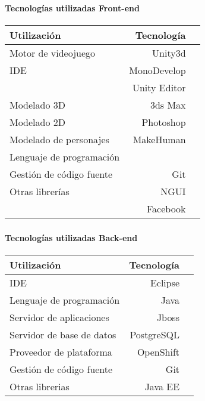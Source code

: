 \begin{frame}
\frametitle{\pagetitle}
\framesubtitle{Tecnologías utilizadas \- Front-end}
\begin{table}
\centering
\begin{tabular}{lrr}
\toprule
\textbf{Utilización} & \textbf{Tecnología} \\
\midrule
Motor de videojuego      & Unity3d         \\
IDE                      & MonoDevelop     \\
                         & Unity Editor    \\
\midrule
Modelado 3D              & 3ds Max         \\
Modelado 2D              & Photoshop       \\
Modelado de personajes   & MakeHuman       \\

\midrule
Lenguaje de programación & \cs{} \\
Gestión de código fuente & Git \\
Otras librerías          & NGUI            \\
                         & Facebook \\
                         
\bottomrule
\end{tabular}
\end{table}
\end{frame}

\begin{frame}
\frametitle{\pagetitle}
\framesubtitle{Tecnologías utilizadas \- Back-end}
\begin{table}
\centering
\begin{tabular}{lrr}
\toprule
\textbf{Utilización} & \textbf{Tecnología}  \\
\midrule
IDE                         & Eclipse \\
Lenguaje de programación    & Java \\
\midrule
Servidor de aplicaciones    & Jboss \\
Servidor de base de datos   & PostgreSQL \\
Proveedor de plataforma     & OpenShift \\
\midrule
Gestión de código fuente    & Git \\
Otras librerias             & Java EE \\

\bottomrule
\end{tabular}
\end{table}
\end{frame}

